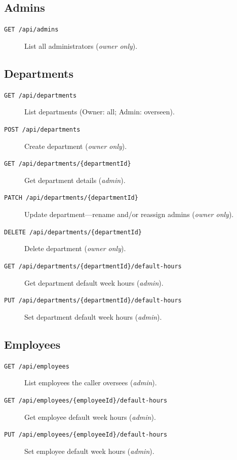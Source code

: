 \documentclass[11pt,a4paper]{article}
\begin{document}
\subsection{Admins}
\begin{description}
    \item[\texttt{GET /api/admins}] List all administrators (\textit{owner only}).
\end{description}

\subsection{Departments}
\begin{description}
    \item[\texttt{GET /api/departments}] List departments (Owner: all; Admin: overseen).
    \item[\texttt{POST /api/departments}] Create department (\textit{owner only}).
    \item[\texttt{GET /api/departments/\{departmentId\}}] Get department details (\textit{admin}).
    \item[\texttt{PATCH /api/departments/\{departmentId\}}] Update department---rename and/or reassign admins (\textit{owner only}).
    \item[\texttt{DELETE /api/departments/\{departmentId\}}] Delete department (\textit{owner only}).
    \item[\texttt{GET /api/departments/\{departmentId\}/default-hours}] Get department default week hours (\textit{admin}).
    \item[\texttt{PUT /api/departments/\{departmentId\}/default-hours}] Set department default week hours (\textit{admin}).
\end{description}

\subsection{Employees}
\begin{description}
    \item[\texttt{GET /api/employees}] List employees the caller oversees (\textit{admin}).
    \item[\texttt{GET /api/employees/\{employeeId\}/default-hours}] Get employee default week hours (\textit{admin}).
    \item[\texttt{PUT /api/employees/\{employeeId\}/default-hours}] Set employee default week hours (\textit{admin}).
\end{description}
\end{document}
